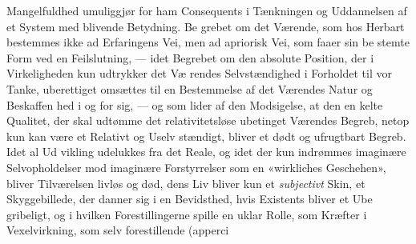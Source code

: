 \documentclass[12pt,a4paper]{book}
\begin{document}
Mangelfuldhed umuliggjør for ham Consequents i Tænkningen
og Uddannelsen af et System med blivende Betydning. Be\-%
grebet om det Værende, som hos Herbart bestemmes ikke ad
Erfaringens Vei, men ad apriorisk Vei, som faaer sin be\-%
stemte Form ved en Feilslutning, --- idet Begrebet om den
absolute Position, der i Virkeligheden kun udtrykker det Væ\-%
rendes Selvstændighed i Forholdet til vor Tanke, uberettiget
omsættes til en Bestemmelse af det Værendes Natur og Beskaffen\-%
hed i og for sig, --- og som lider af den Modsigelse, at den en\-%
kelte Qualitet, der skal udtømme det relativitetsløse ubetinget
Værendes Begreb, netop kun kan være et Relativt og Uselv\-%
stændigt, bliver et dødt og ufrugtbart Begreb. Idet al Ud\-%
vikling udelukkes fra det Reale, og idet der kun indrømmes
imaginære Selvopholdelser mod imaginære Forstyrrelser som
en «wirkliches Geschehen», bliver Tilværelsen livløs og død,
dens Liv bliver kun et \emph{subjectivt} Skin, et Skyggebillede,
der danner sig i en Bevidsthed, hvis Existents bliver et Ube\-%
gribeligt, og i hvilken Forestillingerne spille en uklar Rolle,
som Kræfter i Vexelvirkning, som selv forestillende (apperci\-%
\end{document}
